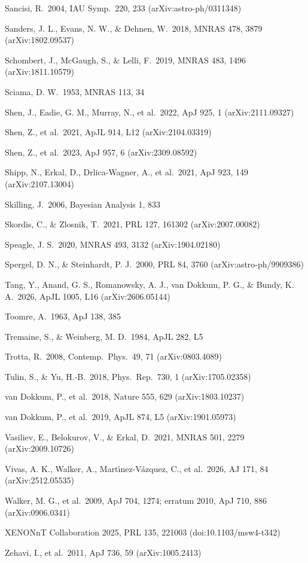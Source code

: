 \documentclass[
  10pt,
]{article}
\begin{document}
{\begin{list}{}{\setlength{\leftmargin}{1.5em}\setlength{\itemindent}{-1.5em}\setlength{\itemsep}{1pt}\setlength{\parsep}{0pt}}
\item Sancisi, R.\ 2004, IAU Symp.\ 220, 233 (arXiv:astro-ph/0311348)
\item Sanders, J. L., Evans, N. W., \& Dehnen, W.\ 2018, MNRAS 478, 3879 (arXiv:1802.09537)
\item Schombert, J., McGaugh, S., \& Lelli, F.\ 2019, MNRAS 483, 1496 (arXiv:1811.10579)
\item Sciama, D. W.\ 1953, MNRAS 113, 34
\item Shen, J., Eadie, G. M., Murray, N., et al.\ 2022, ApJ 925, 1 (arXiv:2111.09327)
\item Shen, Z., et al.\ 2021, ApJL 914, L12 (arXiv:2104.03319)
\item Shen, Z., et al.\ 2023, ApJ 957, 6 (arXiv:2309.08592)
\item Shipp, N., Erkal, D., Drlica-Wagner, A., et al.\ 2021, ApJ 923, 149 (arXiv:2107.13004)
\item Skilling, J.\ 2006, Bayesian Analysis 1, 833
\item Skordis, C., \& Zlosnik, T.\ 2021, PRL 127, 161302 (arXiv:2007.00082)
\item Speagle, J. S.\ 2020, MNRAS 493, 3132 (arXiv:1904.02180)
\item Spergel, D. N., \& Steinhardt, P. J.\ 2000, PRL 84, 3760 (arXiv:astro-ph/9909386)
\item Tang, Y., Anand, G. S., Romanowsky, A. J., van Dokkum, P. G., \& Bundy, K. A.\ 2026, ApJL 1005, L16 (arXiv:2606.05144)
\item Toomre, A.\ 1963, ApJ 138, 385
\item Tremaine, S., \& Weinberg, M. D.\ 1984, ApJL 282, L5
\item Trotta, R.\ 2008, Contemp.\ Phys.\ 49, 71 (arXiv:0803.4089)
\item Tulin, S., \& Yu, H.-B.\ 2018, Phys.\ Rep.\ 730, 1 (arXiv:1705.02358)
\item van Dokkum, P., et al.\ 2018, Nature 555, 629 (arXiv:1803.10237) \item van Dokkum, P., et al.\ 2019, ApJL 874, L5 (arXiv:1901.05973)
\item Vasiliev, E., Belokurov, V., \& Erkal, D.\ 2021, MNRAS 501, 2279 (arXiv:2009.10726)
\item Vivas, A. K., Walker, A., Mart\'{\i}nez-V\'azquez, C., et al.\ 2026, AJ 171, 84 (arXiv:2512.05535)
\item Walker, M. G., et al.\ 2009, ApJ 704, 1274; erratum 2010, ApJ 710, 886 (arXiv:0906.0341)
\item XENONnT Collaboration 2025, PRL 135, 221003 (doi:10.1103/msw4-t342)
\item Zehavi, I., et al.\ 2011, ApJ 736, 59 (arXiv:1005.2413)
\end{list}}
\end{document}
